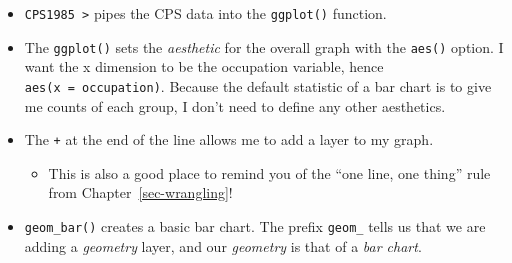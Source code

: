 \documentclass[
  letterpaper,
]{book}
\providecommand{\tightlist}{%
  \setlength{\itemsep}{0pt}\setlength{\parskip}{0pt}}\usepackage{longtable,booktabs,array}
\begin{document}
\begin{itemize}
\tightlist
\item
  \texttt{CPS1985\ \textbar{}\textgreater{}} pipes the CPS data into the
  \texttt{ggplot()} function.
\item
  The \texttt{ggplot()} sets the \emph{aesthetic} for the overall graph
  with the \texttt{aes()} option. I want the x dimension to be the
  occupation variable, hence \texttt{aes(x\ =\ occupation)}. Because the
  default statistic of a bar chart is to give me counts of each group, I
  don't need to define any other aesthetics.
\item
  The \texttt{+} at the end of the line allows me to add a layer to my
  graph.

  \begin{itemize}
  \tightlist
  \item
    This is also a good place to remind you of the ``one line, one
    thing'' rule from Chapter~\ref{sec-wrangling}!
  \end{itemize}
\item
  \texttt{geom\_bar()} creates a basic bar chart. The prefix
  \texttt{geom\_} tells us that we are adding a \emph{geometry} layer,
  and our \emph{geometry} is that of a \emph{bar chart}.
\end{itemize}
\end{document}
